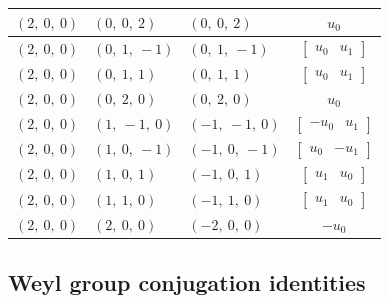 \documentclass[11pt]{article}
\theoremstyle{definition}
\begin{document}
\begin{longtable}{|l|l|l|c|}
    \hline
    $\left( 2, \  0, \  0\right)$ & $\left( 0, \  0, \  2\right)$ & $\left( 0, \  0, \  2\right)$ & $u_{0}$ \\
    \hline
    $\left( 2, \  0, \  0\right)$ & $\left( 0, \  1, \  -1\right)$ & $\left( 0, \  1, \  -1\right)$ & $\left[\begin{matrix}u_{0} & u_{1}\end{matrix}\right]$ \\
    \hline
    $\left( 2, \  0, \  0\right)$ & $\left( 0, \  1, \  1\right)$ & $\left( 0, \  1, \  1\right)$ & $\left[\begin{matrix}u_{0} & u_{1}\end{matrix}\right]$ \\
    \hline
    $\left( 2, \  0, \  0\right)$ & $\left( 0, \  2, \  0\right)$ & $\left( 0, \  2, \  0\right)$ & $u_{0}$ \\
    \hline
    $\left( 2, \  0, \  0\right)$ & $\left( 1, \  -1, \  0\right)$ & $\left( -1, \  -1, \  0\right)$ & $\left[\begin{matrix}- u_{0} & u_{1}\end{matrix}\right]$ \\
    \hline
    $\left( 2, \  0, \  0\right)$ & $\left( 1, \  0, \  -1\right)$ & $\left( -1, \  0, \  -1\right)$ & $\left[\begin{matrix}u_{0} & - u_{1}\end{matrix}\right]$ \\
    \hline
    $\left( 2, \  0, \  0\right)$ & $\left( 1, \  0, \  1\right)$ & $\left( -1, \  0, \  1\right)$ & $\left[\begin{matrix}u_{1} & u_{0}\end{matrix}\right]$ \\
    \hline
    $\left( 2, \  0, \  0\right)$ & $\left( 1, \  1, \  0\right)$ & $\left( -1, \  1, \  0\right)$ & $\left[\begin{matrix}u_{1} & u_{0}\end{matrix}\right]$ \\
    \hline
    $\left( 2, \  0, \  0\right)$ & $\left( 2, \  0, \  0\right)$ & $\left( -2, \  0, \  0\right)$ & $- u_{0}$ \\
    \hline
\end{longtable}


\subsection{Weyl group conjugation identities}
\end{document}
